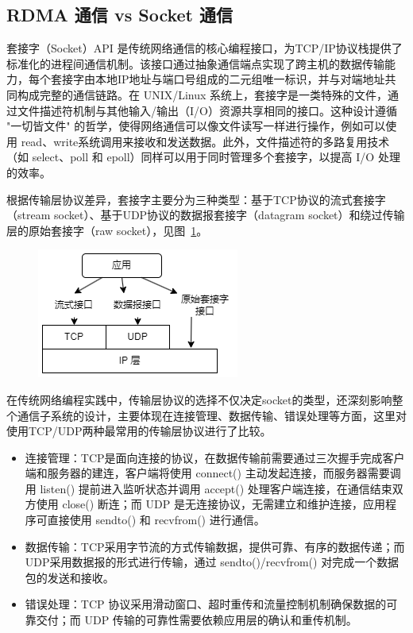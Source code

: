 {    \subsection{RDMA 通信 vs Socket 通信}
    套接字（Socket）API 是传统网络通信的核心编程接口，为TCP/IP协议栈提供了标准化的进程间通信机制。该接口通过抽象通信端点实现了跨主机的数据传输能力，每个套接字由本地IP地址与端口号组成的二元组唯一标识，并与对端地址共同构成完整的通信链路。在 UNIX/Linux 系统上，套接字是一类特殊的文件，通过文件描述符机制与其他输入/输出（I/O）资源共享相同的接口。这种设计遵循 "一切皆文件" 的哲学，使得网络通信可以像文件读写一样进行操作，例如可以使用 read、write系统调用来接收和发送数据。此外，文件描述符的多路复用技术（如 select、poll 和 epoll）同样可以用于同时管理多个套接字，以提高 I/O 处理的效率。

    根据传输层协议差异，套接字主要分为三种类型：基于TCP协议的流式套接字（stream socket）、基于UDP协议的数据报套接字（datagram socket）和绕过传输层的原始套接字（raw socket），见图~\ref{fig:Socket-Type}。
    \begin{figure}[!htbp]
        \centering
        \includegraphics[width=0.35\linewidth]{Img/Socket-Type.png}
        \label{fig:Socket-Type}
    \end{figure}
    在传统网络编程实践中，传输层协议的选择不仅决定socket的类型，还深刻影响整个通信子系统的设计，主要体现在连接管理、数据传输、错误处理等方面，这里对使用TCP/UDP两种最常用的传输层协议进行了比较。

    \begin{itemize}
        \item 连接管理：TCP是面向连接的协议，在数据传输前需要通过三次握手完成客户端和服务器的建连，客户端将使用 connect() 主动发起连接，而服务器需要调用 listen() 提前进入监听状态并调用 accept() 处理客户端连接，在通信结束双方使用 close() 断连；而 UDP 是无连接协议，无需建立和维护连接，应用程序可直接使用 sendto() 和 recvfrom() 进行通信。
        \item 数据传输：TCP采用字节流的方式传输数据，提供可靠、有序的数据传递；而 UDP采用数据报的形式进行传输，通过 sendto()/recvfrom() 对完成一个数据包的发送和接收。
        \item 错误处理：TCP 协议采用滑动窗口、超时重传和流量控制机制确保数据的可靠交付；而 UDP 传输的可靠性需要依赖应用层的确认和重传机制。
    \end{itemize}

}
